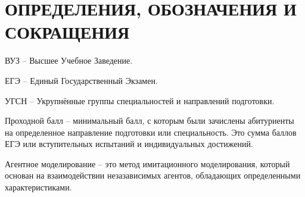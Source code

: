 \section*{ОПРЕДЕЛЕНИЯ, ОБОЗНАЧЕНИЯ И СОКРАЩЕНИЯ}

ВУЗ – Высшее Учебное Заведение.

ЕГЭ – Единый Государственный Экзамен.

УГСН – Укрупнённые группы специальностей и направлений подготовки.

Проходной балл – минимальный балл, с которым были зачислены абитуриенты на определенное направление подготовки или специальность. Это сумма баллов ЕГЭ или вступительных испытаний и индивидуальных достижений.

Агентное моделирование – это метод имитационного моделирования, который основан на взаимодействии незазависимых агентов, 
обладающих определенными характеристиками.

\pagebreak